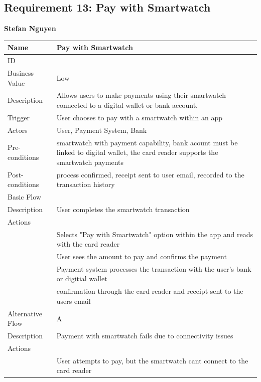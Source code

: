 \documentclass{article}
\begin{document}
\subsection{Requirement 13: Pay with Smartwatch}
	\textbf{Stefan Nguyen}
	\begin{center}
		\begin{tabularx}{1.0\textwidth}{|>{\raggedright\arraybackslash}p{}|>{\raggedright\arraybackslash}X|}
			\hline
			Name             & Pay with Smartwatch \\ \hline
			ID               & 13 \\ \hline
			Business Value   & Low \\ \hline
			Description      & Allows users to make payments using their smartwatch connected to a digital wallet or bank account. \\ \hline
			Trigger          & User chooses to pay with a smartwatch within an app  \\ \hline
			Actors           & User, Payment System, Bank \\ \hline
			Pre-conditions   & smartwatch with payment capability, bank acount must be linked to digital wallet, the card reader supports the smartwatch payments \\ \hline
			Post-conditions  & process confirmed, receipt sent to user email, recorded to the transaction history \\ \hline
			Basic Flow       & \\ \hline
							Description & User completes the smartwatch transaction \\ \hline
							Actions & \\ \hline
							1 & Selects "Pay with Smartwatch" option within the app and reads with the card reader \\ \hline
							2 & User sees the amount to pay and confirms the payment  \\ \hline
							3 & Payment system processes the transaction with the user's bank or digitial wallet \\ \hline
							4 & confirmation through the card reader and receipt sent to the users email \\ \hline
			Alternative Flow & A \\ \hline
							Description & Payment with smartwatch fails due to connectivity issues \\ \hline
							Actions & \\ \hline
							1 & User attempts to pay, but the smartwatch cant connect to the card reader \\ \hline

\end{tabularx}
\end{center}
\end{document}
